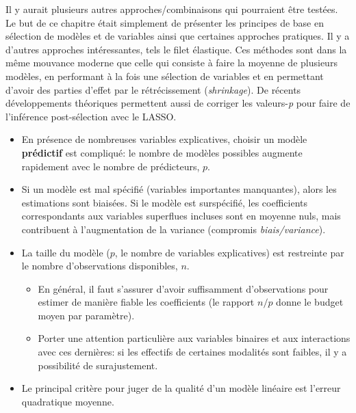 \documentclass[
  11pt,
  letterpaper,
]{scrbook}
\providecommand{\tightlist}{%
  \setlength{\itemsep}{0pt}\setlength{\parskip}{0pt}}\usepackage{longtable,booktabs,array}
\theoremstyle{definition}
\theoremstyle{remark}
\begin{document}
Il y aurait plusieurs autres approches/combinaisons qui pourraient être
testées. Le but de ce chapitre était simplement de présenter les
principes de base en sélection de modèles et de variables ainsi que
certaines approches pratiques. Il y a d'autres approches intéressantes,
tels le filet élastique. Ces méthodes sont dans la même mouvance moderne
que celle qui consiste à faire la moyenne de plusieurs modèles, en
performant à la fois une sélection de variables et en permettant d'avoir
des parties d'effet par le rétrécissement (\emph{shrinkage}). De récents
développements théoriques permettent aussi de corriger les
valeurs-\emph{p} pour faire de l'inférence post-sélection avec le LASSO.

\begin{tcolorbox}[enhanced jigsaw, title=\textcolor{quarto-callout-note-color}{\faInfo}\hspace{0.5em}{En résumé}, toptitle=1mm, bottomrule=.15mm, leftrule=.75mm, left=2mm, opacityback=0, colbacktitle=quarto-callout-note-color!10!white, coltitle=black, toprule=.15mm, colframe=quarto-callout-note-color-frame, breakable, bottomtitle=1mm, titlerule=0mm, arc=.35mm, colback=white, rightrule=.15mm, opacitybacktitle=0.6]

\begin{itemize}
\tightlist
\item
  En présence de nombreuses variables explicatives, choisir un modèle
  \textbf{prédictif} est compliqué: le nombre de modèles possibles
  augmente rapidement avec le nombre de prédicteurs, \(p\).
\item
  Si un modèle est mal spécifié (variables importantes manquantes),
  alors les estimations sont biaisées. Si le modèle est surspécifié, les
  coefficients correspondants aux variables superflues incluses sont en
  moyenne nuls, mais contribuent à l'augmentation de la variance
  (compromis \emph{biais/variance}).
\item
  La taille du modèle (\(p\), le nombre de variables explicatives) est
  restreinte par le nombre d'observations disponibles, \(n\).

  \begin{itemize}
  \tightlist
  \item
    En général, il faut s'assurer d'avoir suffisamment d'observations
    pour estimer de manière fiable les coefficients (le rapport \(n/p\)
    donne le budget moyen par paramètre).
  \item
    Porter une attention particulière aux variables binaires et aux
    interactions avec ces dernières: si les effectifs de certaines
    modalités sont faibles, il y a possibilité de surajustement.
  \end{itemize}
\item
  Le principal critère pour juger de la qualité d'un modèle linéaire est
  l'erreur quadratique moyenne.


\end{itemize}
\end{tcolorbox}
\end{document}
